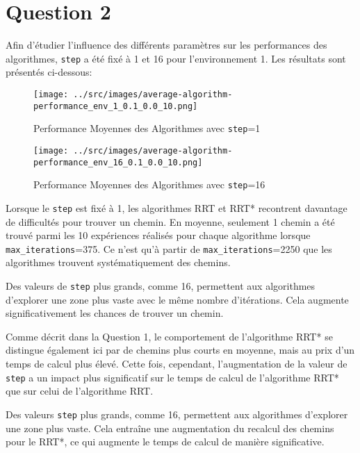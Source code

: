 \documentclass[../CSC_5RO16_TA_TP2.tex]{subfiles}
\begin{document}
\section{Question 2}
\noindent Afin d'étudier l'influence des différents paramètres sur les performances des algorithmes, \texttt{step} a été fixé à 1 et 16 pour l'environnement 1. Les résultats sont présentés ci-dessous:
\begin{figure}[H]
    \centering
	\texttt{[image: ../src/images/average-algorithm-performance\_env\_1\_0.1\_0.0\_10.png]}
	\caption{Performance Moyennes des Algorithmes avec \texttt{step}=1}
	\label{}
\end{figure}
\begin{figure}[H]
    \centering
	\texttt{[image: ../src/images/average-algorithm-performance\_env\_16\_0.1\_0.0\_10.png]}
	\caption{Performance Moyennes des Algorithmes avec \texttt{step}=16}
	\label{}
\end{figure}
\noindent Lorsque le \texttt{step} est fixé à 1, les algorithmes \textcolor{graph_blue}{RRT} et \textcolor{graph_orange}{RRT*} recontrent davantage de difficultés pour trouver un chemin. En moyenne, seulement 1 chemin a été trouvé parmi les 10 expériences réalisés pour chaque algorithme lorsque \texttt{max\_iterations}=375. Ce n'est qu'à partir de \texttt{max\_iterations}=2250 que les algorithmes trouvent systématiquement des chemins.
\begin{remark}
    Des valeurs de \texttt{step} plus grands, comme 16, permettent aux algorithmes d'explorer une zone plus vaste avec le même nombre d'itérations. Cela augmente significativement les chances de trouver un chemin.
\end{remark}
\noindent Comme décrit dans la Question 1, le comportement de l'algorithme \textcolor{graph_orange}{RRT*} se distingue également ici par de chemins plus courts en moyenne, mais au prix d'un temps de calcul plus élevé. Cette fois, cependant, l'augmentation de la valeur de \texttt{step} a un impact plus significatif sur le temps de calcul de l'algorithme \textcolor{graph_orange}{RRT*} que sur celui de l'algorithme \textcolor{graph_blue}{RRT}.
\begin{remark}
    Des valeurs \texttt{step} plus grands, comme 16, permettent aux algorithmes d'explorer une zone plus vaste. Cela entraîne une augmentation du recalcul des chemins pour le \textcolor{graph_orange}{RRT*}, ce qui augmente le temps de calcul de manière significative.
\end{remark}
\end{document}
